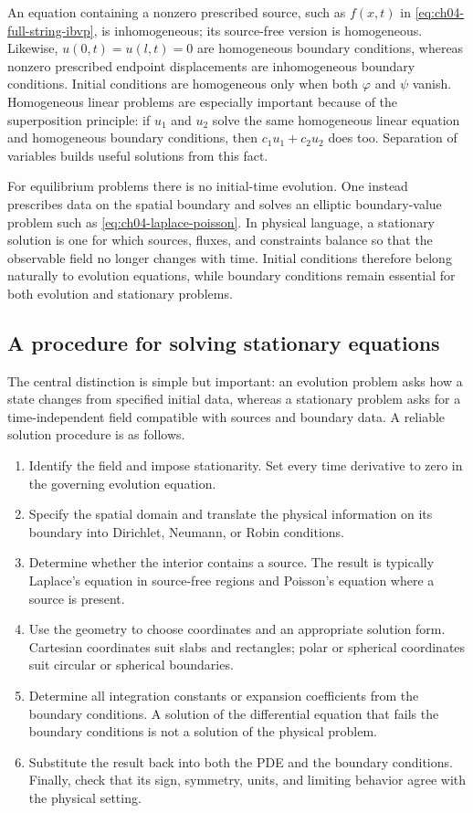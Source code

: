 An equation containing a nonzero prescribed source, such as $f(x,t)$ in \eqref{eq:ch04-full-string-ibvp}, is inhomogeneous; its source-free version is homogeneous. Likewise, $u(0,t)=u(l,t)=0$ are homogeneous boundary conditions, whereas nonzero prescribed endpoint displacements are inhomogeneous boundary conditions. Initial conditions are homogeneous only when both $\varphi$ and $\psi$ vanish. Homogeneous linear problems are especially important because of the superposition principle: if $u_1$ and $u_2$ solve the same homogeneous linear equation and homogeneous boundary conditions, then $c_1u_1+c_2u_2$ does too. Separation of variables builds useful solutions from this fact.

For equilibrium problems there is no initial-time evolution. One instead prescribes data on the spatial boundary and solves an elliptic boundary-value problem such as \eqref{eq:ch04-laplace-poisson}. In physical language, a stationary solution is one for which sources, fluxes, and constraints balance so that the observable field no longer changes with time. Initial conditions therefore belong naturally to evolution equations, while boundary conditions remain essential for both evolution and stationary problems.

\subsection{A procedure for solving stationary equations}

The central distinction is simple but important: an evolution problem asks how a state changes from specified initial data, whereas a stationary problem asks for a time-independent field compatible with sources and boundary data. A reliable solution procedure is as follows.
\begin{enumerate}
\item Identify the field and impose stationarity. Set every time derivative to zero in the governing evolution equation.
\item Specify the spatial domain and translate the physical information on its boundary into Dirichlet, Neumann, or Robin conditions.
\item Determine whether the interior contains a source. The result is typically Laplace's equation in source-free regions and Poisson's equation where a source is present.
\item Use the geometry to choose coordinates and an appropriate solution form. Cartesian coordinates suit slabs and rectangles; polar or spherical coordinates suit circular or spherical boundaries.
\item Determine all integration constants or expansion coefficients from the boundary conditions. A solution of the differential equation that fails the boundary conditions is not a solution of the physical problem.
\item Substitute the result back into both the PDE and the boundary conditions. Finally, check that its sign, symmetry, units, and limiting behavior agree with the physical setting.
\end{enumerate}

